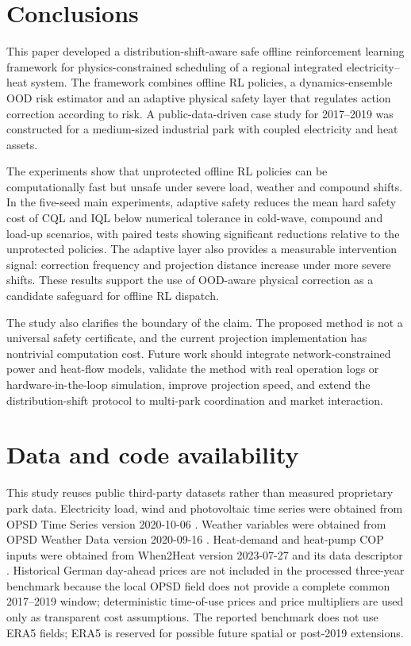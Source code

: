 \documentclass[preprint,12pt]{elsarticle}
\begin{document}
\section{Conclusions}

This paper developed a distribution-shift-aware safe offline reinforcement learning framework for physics-constrained scheduling of a regional integrated electricity--heat system. The framework combines offline RL policies, a dynamics-ensemble OOD risk estimator and an adaptive physical safety layer that regulates action correction according to risk. A public-data-driven case study for 2017--2019 was constructed for a medium-sized industrial park with coupled electricity and heat assets.

The experiments show that unprotected offline RL policies can be computationally fast but unsafe under severe load, weather and compound shifts. In the five-seed main experiments, adaptive safety reduces the mean hard safety cost of CQL and IQL below numerical tolerance in cold-wave, compound and load-up scenarios, with paired tests showing significant reductions relative to the unprotected policies. The adaptive layer also provides a measurable intervention signal: correction frequency and projection distance increase under more severe shifts. These results support the use of OOD-aware physical correction as a candidate safeguard for offline RL dispatch.

The study also clarifies the boundary of the claim. The proposed method is not a universal safety certificate, and the current projection implementation has nontrivial computation cost. Future work should integrate network-constrained power and heat-flow models, validate the method with real operation logs or hardware-in-the-loop simulation, improve projection speed, and extend the distribution-shift protocol to multi-park coordination and market interaction.

\section*{Data and code availability}

This study reuses public third-party datasets rather than measured proprietary park data. Electricity load, wind and photovoltaic time series were obtained from OPSD Time Series version 2020-10-06 \cite{OPSD2020TimeSeries}. Weather variables were obtained from OPSD Weather Data version 2020-09-16 \cite{OPSD2020WeatherData}. Heat-demand and heat-pump COP inputs were obtained from When2Heat version 2023-07-27 and its data descriptor \cite{Moller2019When2Heat,OPSD2023When2HeatDataset}. Historical German day-ahead prices are not included in the processed three-year benchmark because the local OPSD field does not provide a complete common 2017--2019 window; deterministic time-of-use prices and price multipliers are used only as transparent cost assumptions. The reported benchmark does not use ERA5 fields; ERA5 is reserved for possible future spatial or post-2019 extensions.
\end{document}
